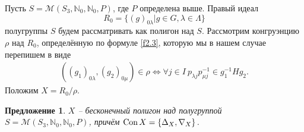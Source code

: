 \documentclass[a4paper]{article}
\newtheorem{proposition}{Предложение}
\newcommand{\Con}{\textnormal{Con}\, }
\begin{document}
	\par Пусть $S = \mathcal{M}(S_3,\mathbb{N}_0,\mathbb{N}_0,P)$, где $P$ определена выше. Правый идеал $$ R_0 = \{ (g)_{0 \lambda} | g \in G, \lambda \in \Lambda \} $$ полугруппы $S$ будем рассматривать как полигон над $S$. Рассмотрим конгруэнцию $\rho$ над $R_0$, определённую по формуле \ref{f2.3}, которую мы в нашем случае перепишем в виде
	\begin{gather}
		((g_1)_{0 \lambda},(g_2)_{0 \mu}) \in \rho \Leftrightarrow \forall j \in I \ p_{\lambda j} p_{\mu j}^{-1} \in g_1^{-1} H g_2. \label{f2.4}
	\end{gather}
	Положим $X = {R_0}/{\rho}$.
	\begin{proposition} \label{pr2.1}
		$X$ -- бесконечный полигон над полугруппой $S = \mathcal{M}(S_3,\mathbb{N}_0,\mathbb{N}_0,P)$, причём $\Con X = \{ \Delta_X, \nabla_X \}$.
	\end{proposition}
\end{document}
